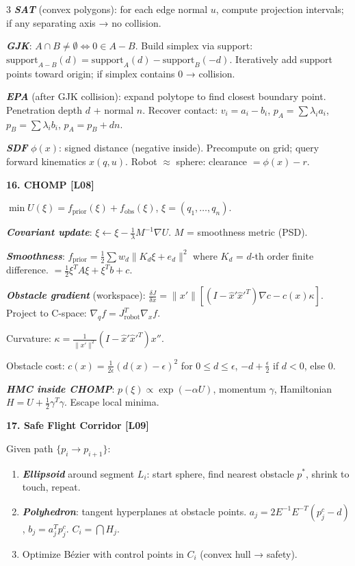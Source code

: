 \documentclass[8pt,a4paper,landscape]{extarticle}
\newcommand{\sect}[1]{\vspace{1pt}\colorbox{black!10}{\parbox{\linewidth}{\textbf{\footnotesize #1}}}\vspace{1pt}}
\newcommand{\sub}[1]{\textbf{\textit{#1}}}
\begin{document}
\begin{multicols*}{3}
\sub{SAT} (convex polygons): for each edge normal $u$, compute projection intervals; if any separating axis → no collision.

\sub{GJK}: $A\cap B\ne\emptyset \iff 0\in A-B$. Build simplex via support: $\text{support}_{A-B}(d)=\text{support}_A(d)-\text{support}_B(-d)$. Iteratively add support points toward origin; if simplex contains 0 → collision.

\sub{EPA} (after GJK collision): expand polytope to find closest boundary point. Penetration depth $d$ + normal $n$. Recover contact: $v_i=a_i-b_i$, $p_A=\sum\lambda_i a_i$, $p_B=\sum\lambda_i b_i$, $p_A=p_B+dn$.

\sub{SDF} $\phi(x)$: signed distance (negative inside). Precompute on grid; query forward kinematics $x(q,u)$. Robot $\approx$ sphere: clearance $=\phi(x)-r$.

\sect{16. CHOMP \hfill {\scriptsize[L08]}}
$\min U(\xi)=f_{\text{prior}}(\xi)+f_{\text{obs}}(\xi)$, $\xi=(q_1,\dots,q_n)$.

\sub{Covariant update}: $\xi\leftarrow\xi-\tfrac1\lambda M^{-1}\nabla U$. $M$ = smoothness metric (PSD).

\sub{Smoothness}: $f_{\text{prior}}=\tfrac12\sum w_d\|K_d\xi+e_d\|^2$ where $K_d$ = $d$-th order finite difference. $=\tfrac12\xi^T A\xi+\xi^T b+c$.

\sub{Obstacle gradient} (workspace): $\tfrac{\delta J}{\delta x}=\|x'\|[(I-\hat x'\hat{x}'^T)\nabla c - c(x)\kappa]$.
Project to C-space: $\nabla_q f=J_{\text{robot}}^T \nabla_x f$.

Curvature: $\kappa=\tfrac{1}{\|x'\|^2}(I-\hat x'\hat{x}'^T)x''$.

Obstacle cost: $c(x)=\tfrac{1}{2\epsilon}(d(x)-\epsilon)^2$ for $0\le d\le\epsilon$, $-d+\tfrac\epsilon 2$ if $d<0$, else 0.

\sub{HMC inside CHOMP}: $p(\xi)\propto\exp(-\alpha U)$, momentum $\gamma$, Hamiltonian $H=U+\tfrac12\gamma^T\gamma$. Escape local minima.

\sect{17. Safe Flight Corridor \hfill {\scriptsize[L09]}}
Given path $\{p_i\to p_{i+1}\}$:
\begin{enumerate}
\item \sub{Ellipsoid} around segment $L_i$: start sphere, find nearest obstacle $p^*$, shrink to touch, repeat.
\item \sub{Polyhedron}: tangent hyperplanes at obstacle points. $a_j=2E^{-1}E^{-T}(p_j^c-d)$, $b_j=a_j^T p_j^c$. $C_i=\bigcap H_j$.
\item Optimize Bézier with control points in $C_i$ (convex hull → safety).
\end{enumerate}


\end{multicols*}
\end{document}
